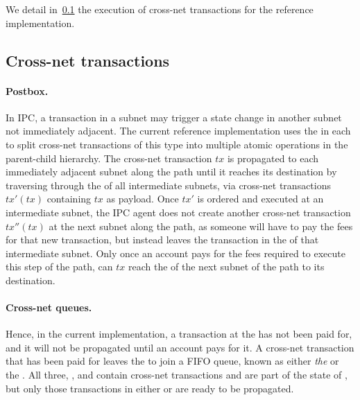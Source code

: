  We detail in~\cref{sec:cnetrefimpl} the execution of cross-net transactions for the reference implementation.
 

\subsection{Cross-net transactions}

\label{sec:cnetrefimpl}
\paragraph{Postbox.} In IPC, a transaction in a subnet may trigger a state change in another subnet not immediately adjacent. The current reference implementation uses the \postoffice in each \gw to split cross-net transactions of this type into multiple atomic operations in the parent-child hierarchy. The cross-net transaction $tx$ is propagated to each immediately adjacent subnet along the path until it reaches its destination by traversing through the \postoffice of all intermediate subnets, via cross-net transactions $tx'(tx)$ containing $tx$ as payload. Once $tx'$ is ordered and executed at an intermediate subnet, the IPC agent does not create another cross-net transaction $tx''(tx)$ at the next subnet along the path, as someone will have to pay the fees for that new transaction, but instead leaves the transaction in the \postoffice of that intermediate subnet. Only once an account pays for the fees required to execute this step of the path, can $tx$ reach the \postoffice of the next subnet of the path to its destination.

\paragraph{Cross-net queues.} Hence, in the current implementation, a transaction at the \postoffice has not been paid for, and it will not be propagated until an account pays for it. A cross-net transaction that has been paid for leaves the \postoffice to join a FIFO queue, known as either \emph{the \bqueue} or the \emph{\tqueue}. All three, \postoffice, \bqueue and \tqueue contain cross-net transactions and are part of the state of \gw, but only those transactions in either \tqueue or \bqueue are ready to be propagated.

